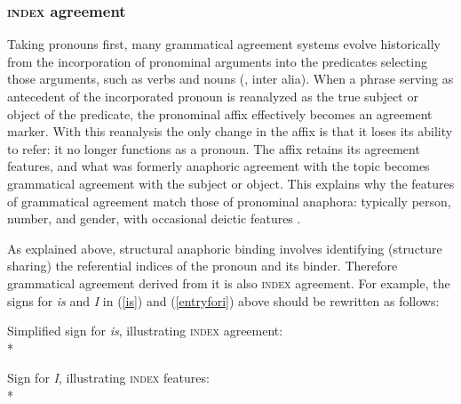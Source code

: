 \documentclass[output=paper
 	        ,biblatex
                ,babelshorthands
                ,newtxmath
                ,draftmode
                ,colorlinks, citecolor=brown
]{langscibook}
\begin{document}
\subsubsection{\textsc{index} agreement}
Taking pronouns first, many grammatical agreement systems evolve historically from the incorporation of pronominal arguments into the predicates selecting those arguments, such as verbs and nouns (\citealt{bopp:1842,givon:1976,wald:1979}, inter alia).  When a phrase serving as antecedent of the incorporated pronoun is reanalyzed as the true subject or object of the predicate,  the pronominal affix effectively becomes an agreement marker.  With this reanalysis the only change in the affix is that it loses its ability to refer: it no longer functions as a pronoun.   The affix retains its agreement features, and what was formerly anaphoric agreement with the topic becomes grammatical agreement with the subject or object.  This explains why the features of grammatical agreement match those of pronominal anaphora: typically person, number, and gender, with occasional deictic features  \citep[752]{bresnan+mchombo:1987}.   

As explained above, structural anaphoric binding involves identifying (structure sharing) the referential indices of the pronoun and its binder.   Therefore grammatical agreement derived from it is also \textsc{index} agreement.   For example, the signs for  \textit{is} and \textit{I} in (\ref{is}) and (\ref{entryfori}) above should be rewritten as follows:

\begin{exe} 

\ex 	\label{is2}
	Simplified sign for \textit{is}, illustrating \textsc{index} agreement:\\*
\end{exe}

\begin{exe} 
\ex	\label{entryfori2}
Sign for  \textit{I}, illustrating  \textsc{index} features:\\*
\end{exe}
\end{document}
